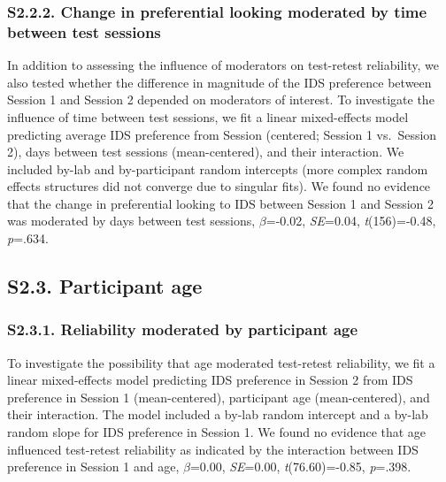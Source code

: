 \documentclass[
  english,
  man, donotrepeattitle,floatsintext]{apa6}
\begin{document}
\hypertarget{s2.2.2.-change-in-preferential-looking-moderated-by-time-between-test-sessions}{%
\subsubsection{S2.2.2. Change in preferential looking moderated by time between test sessions}\label{s2.2.2.-change-in-preferential-looking-moderated-by-time-between-test-sessions}}

In addition to assessing the influence of moderators on test-retest reliability, we also tested whether the difference in magnitude of the IDS preference between Session 1 and Session 2 depended on moderators of interest.
To investigate the influence of time between test sessions, we fit a linear mixed-effects model predicting average IDS preference from Session (centered; Session 1 vs.~Session 2), days between test sessions (mean-centered), and their interaction.
We included by-lab and by-participant random intercepts (more complex random effects structures did not converge due to singular fits).
We found no evidence that the change in preferential looking to IDS between Session 1 and Session 2 was moderated by days between test sessions, \(\beta\)=-0.02, \emph{SE}=0.04, \emph{t}(156)=-0.48, \emph{p}=.634.

\hypertarget{s2.3.-participant-age}{%
\subsection{S2.3. Participant age}\label{s2.3.-participant-age}}

\hypertarget{s2.3.1.-reliability-moderated-by-participant-age}{%
\subsubsection{S2.3.1. Reliability moderated by participant age}\label{s2.3.1.-reliability-moderated-by-participant-age}}

To investigate the possibility that age moderated test-retest reliability, we fit a linear mixed-effects model predicting IDS preference in Session 2 from IDS preference in Session 1 (mean-centered), participant age (mean-centered), and their interaction.
The model included a by-lab random intercept and a by-lab random slope for IDS preference in Session 1.
We found no evidence that age influenced test-retest reliability as indicated by the interaction between IDS preference in Session 1 and age, \(\beta\)=0.00, \emph{SE}=0.00, \emph{t}(76.60)=-0.85, \emph{p}=.398.
\end{document}
